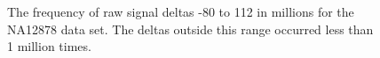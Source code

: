 \begin{figure}
	\centering

	\caption{\label{fig:delta-hist}The frequency of raw signal deltas -80 to 112 in millions for the NA12878 data set. The deltas outside this range occurred less than 1 million times.}
\end{figure}
